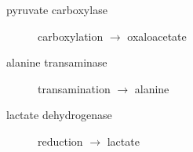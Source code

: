 \documentclass[12pt]{scrartcl}
\begin{document}

\begin{description}
\item[{pyruvate carboxylase}] carboxylation \(\to\) oxaloacetate
\end{description}


\begin{description}
\item[{alanine transaminase}] transamination \(\to\) alanine
\end{description}


\begin{description}
\item[{lactate dehydrogenase}] reduction \(\to\) lactate
\end{description}

\end{document}
